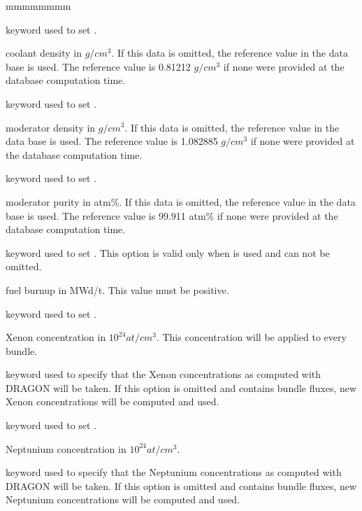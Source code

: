 \begin{ListeDeDescription}{mmmmmmmm}
\item[\moc{RDCL}] keyword used to set .

\item[\dusa{dcool}] coolant density in $g/cm^3$.
If this data is omitted, the
reference value in the data base is used. The reference value is 
0.81212 $g/cm^3$ if none were provided at the database computation time.

\item[\moc{RDMD}] keyword used to set .

\item[\dusa{dmod}] moderator density in $g/cm^3$.
If this data is omitted, the
reference value in the data base is used. The reference value is 
1.082885 $g/cm^3$ if none were provided at the database computation time.

\item[\moc{PUR}] keyword used to set .

\item[\dusa{purity}] moderator purity in atm\%.
If this data is omitted, the
reference value in the data base is used. The reference value is 
99.911 atm\% if none were provided at the database computation time.

\item[\moc{BURN}] keyword used to set . This option is
valid only when  is used and can not be omitted.

\item[\dusa{bval}] fuel burnup in MWd/t. This value must be positive. 

\item[\moc{XENON}] keyword used to set .

\item[\dusa{nXe}] Xenon concentration in $10^{24} at/cm^3$. 
This concentration will be applied to every bundle.

\item[\moc{XEREF}] keyword used to specify that the Xenon concentrations
as computed with DRAGON will be taken. If this option is omitted and  
contains bundle fluxes, new Xenon concentrations will be computed and used.
\item[\moc{NEP}] keyword used to set .

\item[\dusa{nNp}] Neptunium concentration in $10^{24} at/cm^3$. 

\item[\moc{XEREF}] keyword used to specify that the Neptunium concentrations
as computed with DRAGON will be taken. If this option is omitted and  
contains bundle fluxes, new Neptunium concentrations will be computed and used.


\end{ListeDeDescription}
